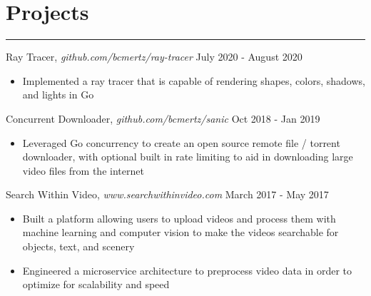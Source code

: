 \documentclass[12pt]{article}
\begin{document}
\vspace{-0.50cm}
\section*{Projects}
\vspace{-0.2cm}
\hrule
\vspace{0.25cm}

\noindent Ray Tracer, \textit{github.com/bcmertz/ray-tracer} \hfill July 2020 - August 2020
\vspace{-0.1cm}
\begin{itemize}
  \itemsep-0.4em
        \item Implemented a ray tracer that is capable of rendering shapes, colors, shadows, and lights in Go
\end{itemize}

\noindent Concurrent Downloader, \textit{github.com/bcmertz/sanic} \hfill Oct 2018 - Jan 2019
\vspace{-0.1cm}
\begin{itemize}
  \itemsep-0.4em
        \item Leveraged Go concurrency to create an open source remote file / torrent downloader, with optional built in rate limiting to aid in downloading large video files from the internet
\end{itemize}


\noindent Search Within Video, \textit{www.searchwithinvideo.com} \hfill March 2017 - May 2017
\vspace{-0.1cm}
\begin{itemize}
  \itemsep-0.4em
        \item Built a platform allowing users to upload videos and process them with machine learning and computer vision to make the videos searchable for objects, text, and scenery
	\item Engineered a microservice architecture to preprocess video data in order to optimize for scalability and speed
\end{itemize}


\end{document}
